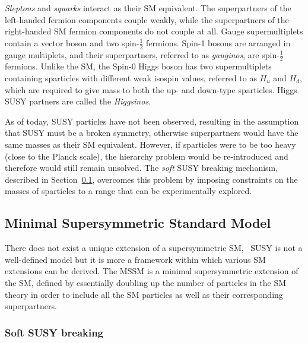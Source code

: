 		\textit{Sleptons} and \textit{squarks} interact as their \ac{SM} equivalent. The superpartners of the left-handed fermion components couple weakly, while the superpartners of the right-handed \ac{SM} fermion components do not couple at all. 
		Gauge supermultiplets contain a vector boson and two spin-$\frac{1}{2}$ fermions. Spin-1 bosons are arranged in gauge multiplets, and their superpartners, referred to as \textit{gauginos}, are spin-$\frac{1}{2}$ fermions. Unlike the \ac{SM}, the Spin-0 Higgs boson has two supermultiplets containing sparticles with different weak isospin values, referred to as $H_u$ and $H_d$, which are required to give mass to both the up- and down-type sparticles. Higgs \ac{SUSY} partners are called the \textit{Higgsinos}.

		As of today, \ac{SUSY} particles have not been observed, resulting in the assumption that \ac{SUSY} must be a broken symmetry, otherwise superpartners would have the same masses as their \ac{SM} equivalent. However, if sparticles were to be too heavy (close to the Planck scale), the hierarchy problem would be re-introduced and therefore would still remain unsolved. The \emph{soft} \ac{SUSY} breaking mechanism, described in Section~\ref{sec:MSSM}, overcomes this problem by imposing constraints on the masses of sparticles to a range that can be experimentally explored. 		


		\subsection{Minimal Supersymmetric Standard Model}
		\label{sec:MSSM}
			
			There does not exist a unique extension of a supersymmetric \ac{SM}, \ie\ \ac{SUSY} is not a well-defined model but it is more a framework within which various \ac{SM} extensions can be derived.
			The \ac{MSSM} is a minimal supersymmetric extension of the \ac{SM}, defined by essentially doubling up the number of particles in the \ac{SM} theory in order to include all the \ac{SM} particles as well as their corresponding superpartners.

			\subsubsection*{Soft SUSY breaking}
				

